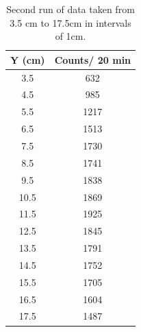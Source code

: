 \begin{table}[H]
\begin{tabular}{|c|c|}\hline
Y (cm) & Counts/ 20 min\\ \hline
3.5 & 632 \\ \hline
4.5 &  985 \\ \hline
5.5 &  1217 \\ \hline
6.5 &  1513 \\ \hline
7.5 &  1730\\ \hline
8.5 &  1741 \\ \hline
9.5 &  1838\\ \hline
10.5 &  1869\\ \hline
11.5 &  1925\\ \hline
12.5 &  1845\\ \hline
13.5 &  1791\\ \hline
14.5 &  1752\\ \hline
15.5 &  1705\\ \hline
16.5 & 1604\\ \hline
17.5 &  1487\\ \hline
\end{tabular}
\caption{Second run of data taken from 3.5 cm to 17.5cm in intervals of 1cm.}
\end{table}




